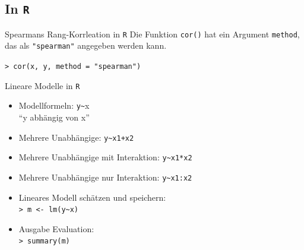 \subsection{In \texttt{R}}

\begin{frame}
  {Spearmans Rang-Korrleation in \texttt{R}}
  Die Funktion \texttt{cor()} hat ein Argument \texttt{method},\\
  das als \texttt{"{}spearman"} angegeben werden kann.\\
  \begin{center}
    \texttt{> cor(x, y, method = "{}spearman")}
  \end{center}
\end{frame}

\begin{frame}
  {Lineare Modelle in \texttt{R}}
  \begin{itemize}[<+->]
    \item Modellformeln: \alert{\texttt{y\textasciitilde}x}\\
      "`y abhängig von x"'
    \item Mehrere Unabhängige: \alert{\texttt{y\textasciitilde x1+x2}}
    \item Mehrere Unabhängige mit \alert{Interaktion}: \alert{\texttt{y\textasciitilde x1*x2}}
    \item Mehrere Unabhängige \alert{nur Interaktion}: \alert{\texttt{y\textasciitilde x1:x2}}
      \vspace{0.5cm}
    \item Lineares Modell schätzen und speichern:\\
      \alert{\texttt{> m <- lm(y\textasciitilde x)}}
    \item Ausgabe Evaluation:\\
      \alert{\texttt{> summary(m)}}
  \end{itemize}
\end{frame}

